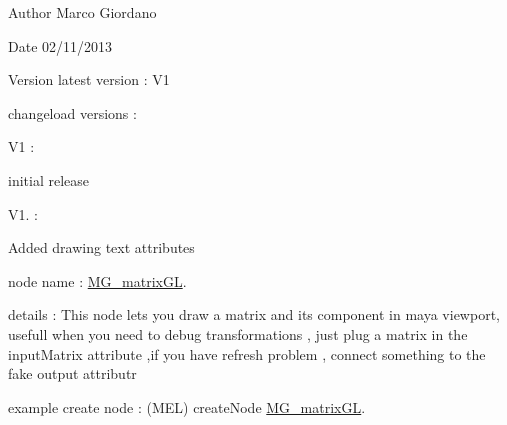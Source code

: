 \begin{DoxyAuthor}{Author}
Marco Giordano 
\end{DoxyAuthor}
\begin{DoxyDate}{Date}
02/11/2013 
\end{DoxyDate}
\begin{DoxyVersion}{Version}
latest version \-: V1 

changeload versions \-: \par
 V1 \-: \par

\begin{DoxyItemize}
\item initial release \par
 V1. \-: \par

\item Added drawing text attributes \par

\end{DoxyItemize}
\end{DoxyVersion}
node name \-: \hyperlink{class_m_g__matrix_g_l}{M\-G\-\_\-matrix\-G\-L}.

details \-: This node lets you draw a matrix and its component in maya viewport, usefull when you need to debug transformations , just plug a matrix in the input\-Matrix attribute ,if you have refresh problem , connect something to the fake output attributr

example create node \-: (M\-E\-L) create\-Node \hyperlink{class_m_g__matrix_g_l}{M\-G\-\_\-matrix\-G\-L}. 

